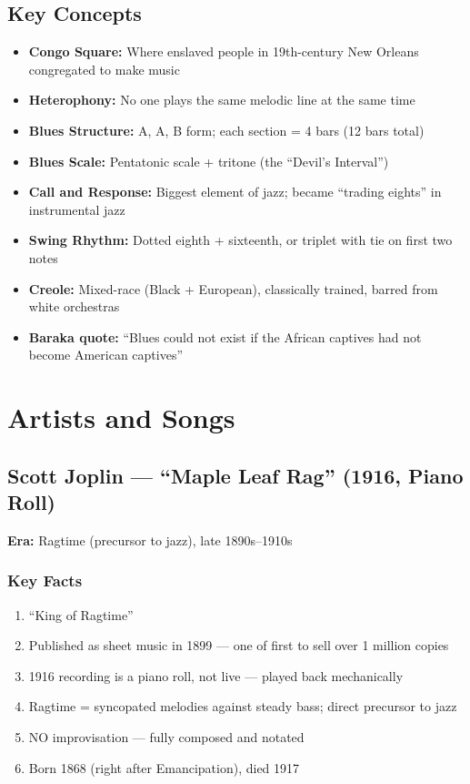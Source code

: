 \documentclass[11pt, letterpaper]{article}
\begin{document}
\subsection{Key Concepts}
\begin{itemize}
    \item \textbf{Congo Square:} Where enslaved people in 19th-century New Orleans congregated to make music
    \item \textbf{Heterophony:} No one plays the same melodic line at the same time
    \item \textbf{Blues Structure:} A, A, B form; each section = 4 bars (12 bars total)
    \item \textbf{Blues Scale:} Pentatonic scale + tritone (the ``Devil's Interval'')
    \item \textbf{Call and Response:} Biggest element of jazz; became ``trading eights'' in instrumental jazz
    \item \textbf{Swing Rhythm:} Dotted eighth + sixteenth, or triplet with tie on first two notes
    \item \textbf{Creole:} Mixed-race (Black + European), classically trained, barred from white orchestras
    \item \textbf{Baraka quote:} ``Blues could not exist if the African captives had not become American captives''
\end{itemize}

\newpage

\section{Artists and Songs}

\subsection{Scott Joplin --- ``Maple Leaf Rag'' (1916, Piano Roll)}

\textbf{Era:} Ragtime (precursor to jazz), late 1890s--1910s

\subsubsection*{Key Facts}
\begin{enumerate}
    \item ``King of Ragtime''
    \item Published as sheet music in 1899 --- one of first to sell over 1 million copies
    \item 1916 recording is a piano roll, not live --- played back mechanically
    \item Ragtime = syncopated melodies against steady bass; direct precursor to jazz
    \item NO improvisation --- fully composed and notated
    \item Born 1868 (right after Emancipation), died 1917
\end{enumerate}
\end{document}
